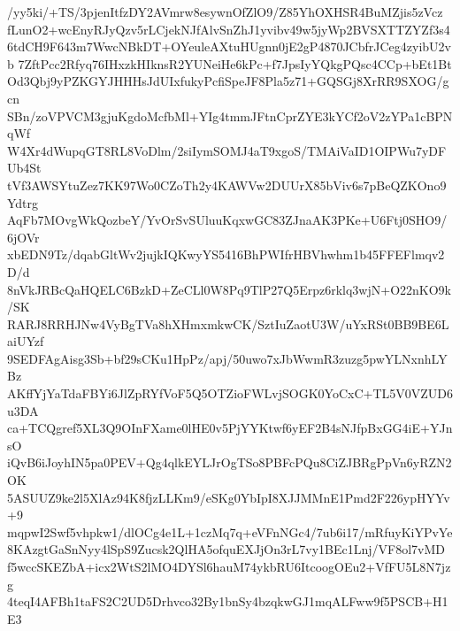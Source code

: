 /yy5ki/+TS/3pjenItfzDY2AVmrw8esywnOfZlO9/Z85YhOXHSR4BuMZjis5zVcz
fLunO2+wcEnyRJyQzv5rLCjekNJfAlvSnZhJ1yvibv49w5jyWp2BVSXTTZYZf3s4
6tdCH9F643m7WwcNBkDT+OYeuleAXtuHUgnn0jE2gP4870JCbfrJCeg4zyibU2vb
7ZftPcc2Rfyq76IHxzkHIknsR2YUNeiHe6kPc+f7JpsIyYQkgPQsc4CCp+bEt1Bt
Od3Qbj9yPZKGYJHHHsJdUIxfukyPcfiSpeJF8Pla5z71+GQSGj8XrRR9SXOG/gcn
SBn/zoVPVCM3gjuKgdoMcfbMl+YIg4tmmJFtnCprZYE3kYCf2oV2zYPa1cBPNqWf
W4Xr4dWupqGT8RL8VoDlm/2siIymSOMJ4aT9xgoS/TMAiVaID1OIPWu7yDFUb4St
tVf3AWSYtuZez7KK97Wo0CZoTh2y4KAWVw2DUUrX85bViv6s7pBeQZKOno9Ydtrg
AqFb7MOvgWkQozbeY/YvOrSvSUluuKqxwGC83ZJnaAK3PKe+U6Ftj0SHO9/6jOVr
xbEDN9Tz/dqabGltWv2jujkIQKwyYS5416BhPWIfrHBVhwhm1b45FFEFlmqv2D/d
8nVkJRBcQaHQELC6BzkD+ZeCLl0W8Pq9TlP27Q5Erpz6rklq3wjN+O22nKO9k/SK
RARJ8RRHJNw4VyBgTVa8hXHmxmkwCK/SztIuZaotU3W/uYxRSt0BB9BE6LaiUYzf
9SEDFAgAisg3Sb+bf29sCKu1HpPz/apj/50uwo7xJbWwmR3zuzg5pwYLNxnhLYBz
AKffYjYaTdaFBYi6JlZpRYfVoF5Q5OTZioFWLvjSOGK0YoCxC+TL5V0VZUD6u3DA
ca+TCQgref5XL3Q9OInFXame0lHE0v5PjYYKtwf6yEF2B4sNJfpBxGG4iE+YJnsO
iQvB6iJoyhIN5pa0PEV+Qg4qlkEYLJrOgTSo8PBFcPQu8CiZJBRgPpVn6yRZN2OK
5ASUUZ9ke2l5XlAz94K8fjzLLKm9/eSKg0YbIpI8XJJMMnE1Pmd2F226ypHYYv+9
mqpwI2Swf5vhpkw1/dlOCg4e1L+1czMq7q+eVFnNGc4/7ub6i17/mRfuyKiYPvYe
8KAzgtGaSnNyy4lSpS9Zucsk2QlHA5ofquEXJjOn3rL7vy1BEc1Lnj/VF8ol7vMD
f5wccSKEZbA+icx2WtS2lMO4DYSl6hauM74ykbRU6ItcoogOEu2+VfFU5L8N7jzg
4teqI4AFBh1taFS2C2UD5Drhvco32By1bnSy4bzqkwGJ1mqALFww9f5PSCB+H1E3
